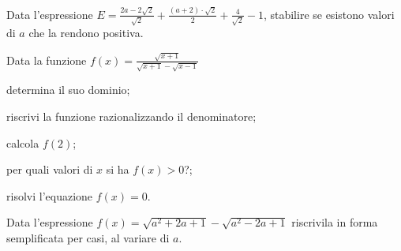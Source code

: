 
\begin{esercizio}%
Data l'espressione $E=\frac{2a-2\sqrt 2}{\sqrt 2}+\frac{(a+2)\cdot \sqrt 2} 2+\frac 4{\sqrt 2}-1$, stabilire se esistono valori di $a$ che la rendono positiva.
\end{esercizio}

\begin{esercizio}%
Data la funzione $f(x)=\frac{\sqrt{x+1}}{\sqrt{x+1}-\sqrt{x-1}}$
 \begin{enumeratea}
 \item determina il suo dominio;
 \item riscrivi la funzione razionalizzando il denominatore;
 \item calcola $f(2)$;
 \item per quali valori di $x$ si ha $f(x)>0$?;
 \item risolvi l'equazione $f(x)=0$.
 \end{enumeratea}
\end{esercizio}

\begin{esercizio}%
Data l'espressione $f(x)=\sqrt{a^2+2a+1}-\sqrt{a^2-2a+1}$ riscrivila in forma semplificata per casi, al variare di $a$.
\end{esercizio}
\newpage
